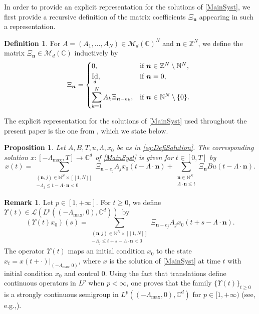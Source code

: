 \documentclass[10pt]{article}
\newcommand{\eg}{e.g.,\xspace}
\renewcommand{\eg}{e.g.,\xspace}
\newcommand{\bn}{\boldsymbol{n}}
\newcommand{\llbracket}{[\![}
\newcommand{\rrbracket}{]\!]}
\theoremstyle{plain}
\newtheorem{prop}[theo]{Proposition}
\theoremstyle{definition}
\newtheorem{defi}[theo]{Definition}
\newtheorem{remk}[theo]{Remark}
\DeclareMathOperator{\id}{Id}
\numberwithin{equation}{section}\numberwithin{figure}{section}\emergencystretch=3em
\begin{document}
In order to provide an explicit representation for the solutions of \eqref{MainSyst}, we first provide a recursive definition of the matrix coefficients $\Xi_{\bn}$ appearing in such a representation.

\begin{defi}
\label{ControlDelayDefiXi}
For $A = (A_1, \dots, A_N) \in \mathcal M_d(\mathbb C)^N$ and $\bn \in \mathbb Z^N$, we define the matrix $\Xi_{\bn} \in \mathcal M_d(\mathbb C)$ inductively by
\begin{equation}
\label{EqControlDelayDefiXi}
\Xi_{\bn} =
\begin{dcases*}
0, & if $\bn \in \mathbb Z^N \setminus \mathbb N^N$, \\
\id_d, & if $\bn = 0$, \\
\sum_{k=1}^N A_k \Xi_{\bn - e_k}, & if $\bn \in \mathbb N^N \setminus \{0\}$. \\
\end{dcases*}
\end{equation}
\end{defi}

The explicit representation for the solutions of \eqref{MainSyst} used throughout the present paper is the one from \cite[Prop.\,2.7]{Mazanti2017Relative}, which we state below.

\begin{prop}
\label{PropExplicit}
Let
$A,B,T,u,\Lambda,x_0$ be as in \eqref{eq:DefiSolution}.
The corresponding solution $x: \left[-\Lambda_{\max}, T\right] \to \mathbb C^d$ of \eqref{MainSyst} is given for $t \in [0, T]$ by
\begin{equation}%
x(t) = \sum_{\substack{(\bn, j) \in \mathbb N^N \times \llbracket 1, N\rrbracket \\ -\Lambda_j \leq t - \Lambda \cdot \bn < 0}} \Xi_{\bn - e_j} A_j x_0(t - \Lambda \cdot \bn) + \sum_{\substack{\bn \in \mathbb N^N \\ \Lambda \cdot \bn \leq t}} \Xi_{\bn} B u(t - \Lambda \cdot \bn).
\end{equation}
\end{prop}

\begin{remk}
\label{RemkSemigroup}
Let $p\!\in\![1, +\infty]$. For $t\!\geq\!0$, we define $\Upsilon(t)\!\in\!\mathcal L(L^p((-\Lambda_{\max}, 0), \mathbb C^d))$~by
\[
(\Upsilon(t)x_0)(s) = \sum_{\substack{(\bn, j) \in \mathbb N^N \times \llbracket 1, N\rrbracket \\ -\Lambda_j \leq t + s - \Lambda \cdot \bn < 0}} \Xi_{\bn - e_j} A_j x_0(t + s - \Lambda \cdot \bn).
\]
The operator $\Upsilon(t)$ maps an initial condition $x_0$ to the state $x_t = \left.x(t + \cdot)\right|_{(-\Lambda_{\max}, 0)}$, where $x$ is the solution of \eqref{MainSyst} at time $t$ with initial condition $x_0$ and control $0$. Using the fact that translations define continuous operators in $L^p$ when $p < \infty$, one proves that the family $\{\Upsilon(t)\}_{t \geq 0}$ is a strongly continuous semigroup in $L^p((-\Lambda_{\max}, 0), \mathbb C^d)$ for $p \in [1, +\infty)$ (see, \eg \cite[Prop.\,3.5]{Chitour2016Stability}).
\end{remk}
\end{document}
